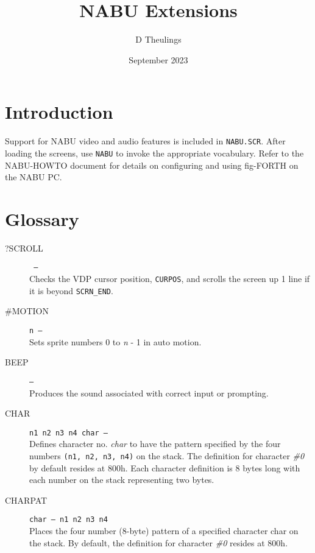 \documentclass{article}
\title{NABU Extensions}
\author{D Theulings}
\date{September 2023}
\begin{document}
	\maketitle
	\begin{multicols}{2}[]
		\setlength{\parskip}{.5em}
		\setlength\parindent{0pt}

		\section{Introduction}
		Support for NABU video and audio features\footnotemark{} is included
		in \verb|NABU.SCR|. After loading the screens, use \verb|NABU| to invoke
		the appropriate vocabulary. Refer to the NABU-HOWTO document for details
		on configuring and using fig-FORTH on the NABU PC.

		\section{Glossary}
		\begin{description}
			\item[?SCROLL]\texttt{ --- }\\
				Checks the VDP cursor position, \verb|CURPOS|, and scrolls the
				screen up 1 line if it is beyond \verb|SCRN_END|.

			\item[\#MOTION]\texttt{n --- }\\
				Sets sprite numbers 0 to \textit{n} - 1 in auto motion.

			\item[BEEP]\texttt{--- }\\
				Produces the sound associated with correct input or prompting.

			\item[CHAR]\texttt{n1 n2 n3 n4 char --- }\\
				Defines character no. \textit{char} to have the pattern specified by
				the four numbers \verb|(n1, n2, n3, n4)| on the stack. The definition
				for character \textit{\#0} by default resides at 800h. Each character
				definition is 8 bytes long with each number on the stack representing
				two bytes.

			\item[CHARPAT]\texttt{char --- n1 n2 n3 n4 }\\
				Places the four number (8-byte) pattern of a specified character char
				on the stack. By default, the definition for character \textit{\#0}
				resides at 800h.


\end{description}
\end{multicols}
\end{document}

